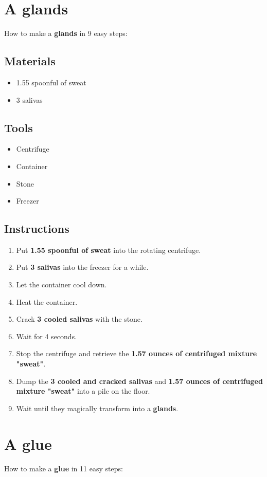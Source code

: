 \documentclass{article}
\begin{document}
\section{A glands}How to make a \textbf{glands} in 9 easy steps:

\subsection{Materials}\begin{itemize}
\item 
1.55 spoonful of sweat
\item 
3 salivas
\end{itemize}
\subsection{Tools}\begin{itemize}
\item 
Centrifuge
\item 
Container
\item 
Stone
\item 
Freezer
\end{itemize}
\subsection{Instructions}\begin{enumerate}
\item 
Put \textbf{1.55 spoonful of sweat} into the rotating centrifuge.
\item 
Put \textbf{3 salivas} into the freezer for a while.
\item 
Let the container cool down.
\item 
Heat the container.
\item 
Crack \textbf{3 cooled salivas} with the stone.
\item 
Wait for 4 seconds.
\item 
Stop the centrifuge and retrieve the \textbf{1.57 ounces of centrifuged mixture "sweat"}.
\item 
Dump the \textbf{3 cooled and cracked salivas} and \textbf{1.57 ounces of centrifuged mixture "sweat"} into a pile on the floor.
\item 
Wait until they magically transform into a \textbf{glands}.
\end{enumerate}
\newpage
\section{A glue}How to make a \textbf{glue} in 11 easy steps:
\end{document}
